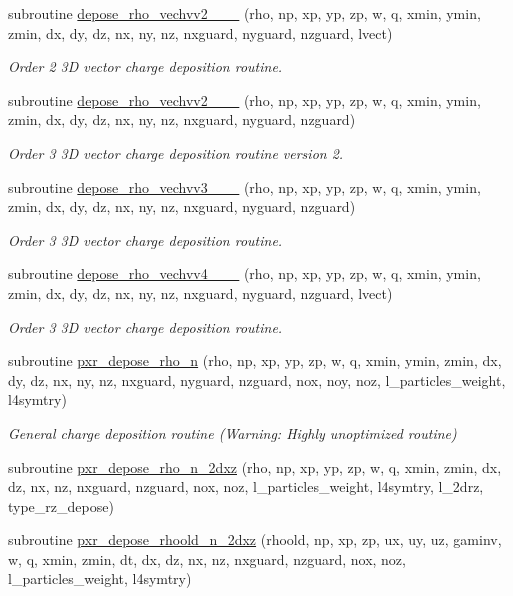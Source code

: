 \begin{DoxyCompactItemize}
subroutine \hyperlink{charge__deposition_8_f90_a618d3787267c54578f40d084c4d915e3}{depose\+\_\+rho\+\_\+vechvv2\+\_\+\_\+\_} (rho, np, xp, yp, zp, w, q, xmin, ymin, zmin, dx, dy, dz, nx, ny, nz, nxguard, nyguard, nzguard, lvect)
\begin{DoxyCompactList}\small\item\em Order 2 3D vector charge deposition routine. \end{DoxyCompactList}\item 
subroutine \hyperlink{charge__deposition_8_f90_a410f5675f18d7fc7da40221984c0f89e}{depose\+\_\+rho\+\_\+vechvv2\+\_\+\_\+\_} (rho, np, xp, yp, zp, w, q, xmin, ymin, zmin, dx, dy, dz, nx, ny, nz, nxguard, nyguard, nzguard)
\begin{DoxyCompactList}\small\item\em Order 3 3D vector charge deposition routine version 2. \end{DoxyCompactList}\item 
subroutine \hyperlink{charge__deposition_8_f90_ac37deeb48a2c970189b6c77f251d2a68}{depose\+\_\+rho\+\_\+vechvv3\+\_\+\_\+\_} (rho, np, xp, yp, zp, w, q, xmin, ymin, zmin, dx, dy, dz, nx, ny, nz, nxguard, nyguard, nzguard)
\begin{DoxyCompactList}\small\item\em Order 3 3D vector charge deposition routine. \end{DoxyCompactList}\item 
subroutine \hyperlink{charge__deposition_8_f90_a55f64905a5f5c387baef1cdddfc060f7}{depose\+\_\+rho\+\_\+vechvv4\+\_\+\_\+\_} (rho, np, xp, yp, zp, w, q, xmin, ymin, zmin, dx, dy, dz, nx, ny, nz, nxguard, nyguard, nzguard, lvect)
\begin{DoxyCompactList}\small\item\em Order 3 3D vector charge deposition routine. \end{DoxyCompactList}\item 
subroutine \hyperlink{charge__deposition_8_f90_a1ba91732b5b34c8c04f7570c8df67c26}{pxr\+\_\+depose\+\_\+rho\+\_\+n} (rho, np, xp, yp, zp, w, q, xmin, ymin, zmin, dx, dy, dz, nx, ny, nz, nxguard, nyguard, nzguard, nox, noy, noz, l\+\_\+particles\+\_\+weight, l4symtry)
\begin{DoxyCompactList}\small\item\em General charge deposition routine (Warning\+: Highly unoptimized routine) \end{DoxyCompactList}\item 
subroutine \hyperlink{charge__deposition_8_f90_a899c2820e69c525f781f0a6c62d3b116}{pxr\+\_\+depose\+\_\+rho\+\_\+n\+\_\+2dxz} (rho, np, xp, yp, zp, w, q, xmin, zmin, dx, dz, nx, nz, nxguard, nzguard, nox, noz, l\+\_\+particles\+\_\+weight, l4symtry, l\+\_\+2drz, type\+\_\+rz\+\_\+depose)
\item 
subroutine \hyperlink{charge__deposition_8_f90_a496878f2bdf85d8dec4a059d6bc40a0f}{pxr\+\_\+depose\+\_\+rhoold\+\_\+n\+\_\+2dxz} (rhoold, np, xp, zp, ux, uy, uz, gaminv, w, q, xmin, zmin, dt, dx, dz, nx, nz, nxguard, nzguard, nox, noz, l\+\_\+particles\+\_\+weight, l4symtry)
\end{DoxyCompactItemize}


